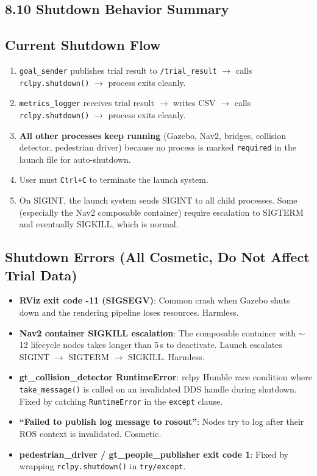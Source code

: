 \documentclass[11pt]{article}
\newcommand{\logentry}[1]{\subsection*{#1}}
\begin{document}

\subsection*{8.10 Shutdown Behavior Summary}

\logentry{Current Shutdown Flow}
\begin{enumerate}
  \item \texttt{goal\_sender} publishes trial result to \texttt{/trial\_result}
    $\to$ calls \texttt{rclpy.shutdown()} $\to$ process exits cleanly.
  \item \texttt{metrics\_logger} receives trial result $\to$ writes CSV
    $\to$ calls \texttt{rclpy.shutdown()} $\to$ process exits cleanly.
  \item \textbf{All other processes keep running} (Gazebo, Nav2, bridges,
    collision detector, pedestrian driver) because no process is marked
    \texttt{required} in the launch file for auto-shutdown.
  \item User must \texttt{Ctrl+C} to terminate the launch system.
  \item On SIGINT, the launch system sends SIGINT to all child processes.
    Some (especially the Nav2 composable container) require escalation to
    SIGTERM and eventually SIGKILL, which is normal.
\end{enumerate}

\logentry{Shutdown Errors (All Cosmetic, Do Not Affect Trial Data)}
\begin{itemize}
  \item \textbf{RViz exit code -11 (SIGSEGV)}: Common crash when Gazebo shuts
    down and the rendering pipeline loses resources. Harmless.
  \item \textbf{Nav2 container SIGKILL escalation}: The composable container
    with $\sim$12 lifecycle nodes takes longer than 5\,s to deactivate.
    Launch escalates SIGINT $\to$ SIGTERM $\to$ SIGKILL. Harmless.
  \item \textbf{gt\_collision\_detector RuntimeError}: rclpy Humble race
    condition where \texttt{take\_message()} is called on an invalidated DDS
    handle during shutdown. Fixed by catching \texttt{RuntimeError} in the
    \texttt{except} clause.
  \item \textbf{``Failed to publish log message to rosout''}: Nodes try to log
    after their ROS context is invalidated. Cosmetic.
  \item \textbf{pedestrian\_driver / gt\_people\_publisher exit code 1}:
    Fixed by wrapping \texttt{rclpy.shutdown()} in \texttt{try/except}.
\end{itemize}
\end{document}

